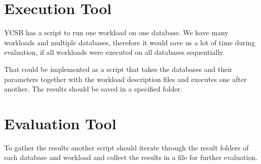 \section{Execution Tool}
\label{ch:design:se:executionTool}
YCSB has a script to run one workload on one database.
We have many workloads and multiple databases,
therefore it would save us a lot of time during evaluation,
if all workloads were executed on all databases sequentially.

That could be implemented as a script that takes the databases and their parameters together with the workload description files and executes one after another.
The results should be saved in a specified folder.

\section{Evaluation Tool}
\label{ch:design:se:evaluationTool}
To gather the results another script should iterate through the result folders of each database and workload and collect the results in a file for further evaluation.
